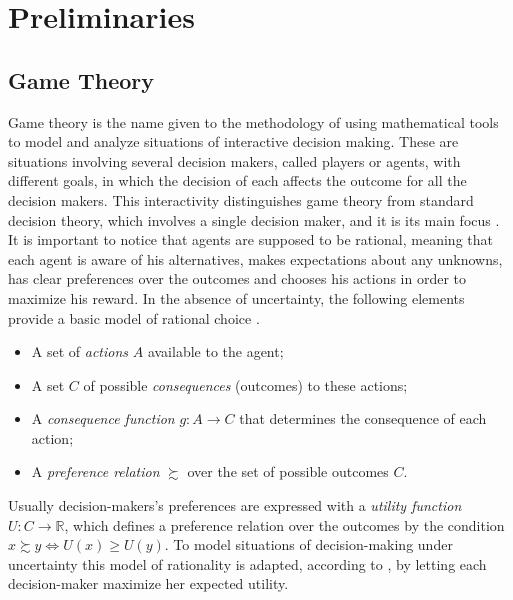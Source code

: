




\chapter{Preliminaries}\label{C2}

\section{Game Theory}
Game theory is the name given to the methodology of using mathematical tools to model and analyze situations of interactive decision making. These are situations involving several decision makers, called players or agents, with different goals, in which the decision of each affects the outcome for all the decision makers. This interactivity distinguishes game theory from standard decision theory, which involves a single decision maker, and it is its main focus \citep{maschler2013game}.
It is important to notice that agents are supposed to be rational, meaning that each agent is aware of his alternatives, makes expectations about any unknowns, has clear preferences over the outcomes and chooses his actions in order to maximize his reward.
In the absence of uncertainty, the following elements provide a basic model of rational choice \citep{Osborne1994}.
\begin{itemize}
	\item A set of \textit{actions} $A$ available to the agent;
	\item A set $C$ of possible \textit{consequences} (outcomes) to these actions;
	\item A \textit{consequence function} $g: A \rightarrow C$ that determines the consequence of each action;
	\item A \textit{preference relation} $\succsim$ over the set of possible outcomes $C$.
\end{itemize}
Usually decision-makers's preferences are expressed with a \textit{utility function} $U: C\rightarrow \mathbb{R}$, which defines a preference relation over the outcomes by the condition $x\succsim y \Leftrightarrow U(x)\geq U(y)$.
To model situations of decision-making under uncertainty this model of rationality is adapted, according to \citep{vonNeumann44}, by letting each decision-maker maximize her expected utility.

